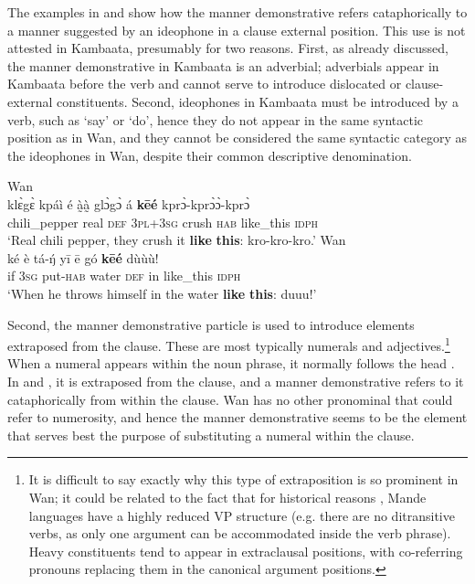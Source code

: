 \documentclass[output=paper,colorlinks,citecolor=brown]{langscibook}
\begin{document}
The examples in  and  show how the manner demonstrative refers cataphorically to a manner suggested by an ideophone in a clause external position. This use is not attested in Kambaata, presumably for two reasons. First, as already discussed, the manner demonstrative in Kambaata is an adverbial; adverbials appear in Kambaata before the verb and cannot serve to introduce dislocated or clause-external constituents. Second, ideophones in Kambaata must be introduced by a verb, such as ‘say’ or ‘do’, hence they do not appear in the same syntactic position as in Wan, and they cannot be considered the same syntactic category as the ideophones in Wan, despite their common descriptive denomination.

\ea\label{ex:nikitina:17}
\ea\label{ex:nikitina:17a} {Wan}\\
\gll kl\`{ɛ}g\`{ɛ} kpáì é à̰à̰ gl\`{ɔ}g\`{ɔ} á \textbf{kēé} kpr\`{ɔ}-kpr\`{ɔ}\`{ɔ}-kpr\`{ɔ}\\
     chili\_pepper real \textsc{def} \textsc{3pl+3sg} crush \textsc{hab} like\_this \textsc{idph}\\
\glt ‘Real chili pepper, they crush it \textbf{like} \textbf{this}: kro-kro-kro.’
\ex\label{ex:nikitina:17b} {Wan}\\
\gll ké è tá-\'{ŋ} yī ē gó \textbf{kēé} dùùù!\\
     if \textsc{3sg} put-\textsc{hab} water \textsc{def} in like\_this \textsc{idph}\\
\glt ‘When he throws himself in the water \textbf{like} \textbf{this}: duuu!’
\z
\z

Second, the manner demonstrative particle is used to introduce elements extraposed from the clause. These are most typically numerals and adjectives.\footnote{It is difficult to say exactly why this type of extraposition is so prominent in Wan; it could be related to the fact that for historical reasons \citep{Nikitina2011}, Mande languages have a highly reduced VP structure (e.g. there are no ditransitive verbs, as only one argument can be accommodated inside the verb phrase). Heavy constituents tend to appear in extraclausal positions, with co-referring pronouns replacing them in the canonical argument positions.} When a numeral appears within the noun phrase, it normally follows the head . In  and , it is extraposed from the clause, and a manner demonstrative refers to it cataphorically from within the clause. Wan has no other pronominal that could refer to numerosity, and hence the manner demonstrative seems to be the element that serves best the purpose of substituting a numeral within the clause.
\end{document}
